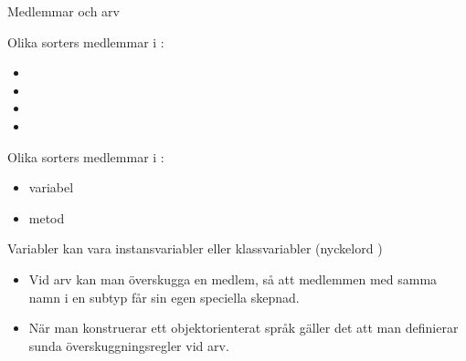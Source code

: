 




\begin{Slide}{Medlemmar och arv}\SlideFontSmall
\begin{multicols}{2}
Olika sorters medlemmar i :
\begin{itemize}
\item {}
\item {}
\item {}
\item {}

\end{itemize}

\columnbreak

Olika sorters medlemmar i :
\begin{itemize}
\item variabel 
\item metod
\end{itemize}

\vspace{1em}

Variabler kan vara instansvariabler eller klassvariabler (nyckelord )

\end{multicols}

\pause
\begin{itemize}
\item Vid arv kan man överskugga  en medlem, så att medlemmen med samma namn i en subtyp får sin egen speciella skepnad.

\item När man konstruerar ett objektorienterat språk gäller det att man definierar sunda överskuggningsregler vid arv.
\end{itemize}
\end{Slide}


